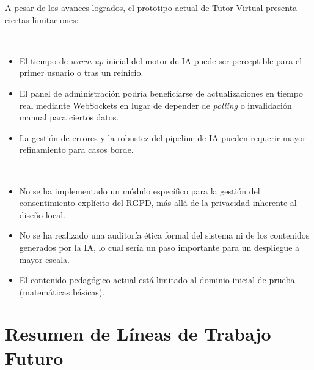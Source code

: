 A pesar de los avances logrados, el prototipo actual de Tutor Virtual presenta ciertas limitaciones:
\begin{description}[leftmargin=*, style=unboxed,font=\normalfont]
  \item[Limitaciones Técnicas:]\\
    \begin{itemize}
        \item El tiempo de \emph{warm-up} inicial del motor de IA puede ser perceptible para el primer usuario o tras un reinicio.
        \item El panel de administración podría beneficiarse de actualizaciones en tiempo real mediante WebSockets en lugar de depender de \emph{polling} o invalidación manual para ciertos datos.
        \item La gestión de errores y la robustez del pipeline de IA pueden requerir mayor refinamiento para casos borde.
    \end{itemize}
  \item[Limitaciones No Técnicas (Ámbito y Cumplimiento):]\\
    \begin{itemize}
        \item No se ha implementado un módulo específico para la gestión del consentimiento explícito del RGPD, más allá de la privacidad inherente al diseño local.
        \item No se ha realizado una auditoría ética formal del sistema ni de los contenidos generados por la IA, lo cual sería un paso importante para un despliegue a mayor escala.
        \item El contenido pedagógico actual está limitado al dominio inicial de prueba (matemáticas básicas).
    \end{itemize}
\end{description}

\section{Resumen de Líneas de Trabajo Futuro}
\label{sec:trabajo_futuro_resumen_aportaciones}

